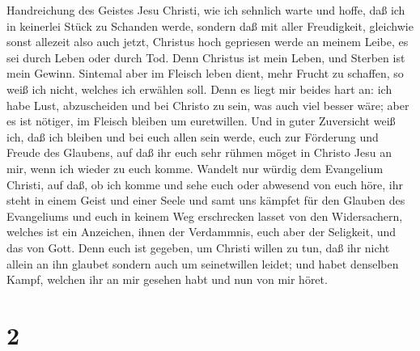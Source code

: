 Handreichung des Geistes Jesu Christi,  wie ich sehnlich
warte und hoffe, daß ich in keinerlei Stück zu Schanden werde, sondern
daß mit aller Freudigkeit, gleichwie sonst allezeit also auch jetzt,
Christus hoch gepriesen werde an meinem Leibe, es sei durch Leben oder
durch Tod.  Denn Christus ist mein Leben, und Sterben ist
mein Gewinn.  Sintemal aber im Fleisch leben dient, mehr
Frucht zu schaffen, so weiß ich nicht, welches ich erwählen soll.
 Denn es liegt mir beides hart an: ich habe Lust,
abzuscheiden und bei Christo zu sein, was auch viel besser wäre;
 aber es ist nötiger, im Fleisch bleiben um euretwillen.
 Und in guter Zuversicht weiß ich, daß ich bleiben und bei
euch allen sein werde, euch zur Förderung und Freude des Glaubens,
 auf daß ihr euch sehr rühmen möget in Christo Jesu an mir,
wenn ich wieder zu euch komme.  Wandelt nur würdig dem
Evangelium Christi, auf daß, ob ich komme und sehe euch oder abwesend
von euch höre, ihr steht in einem Geist und einer Seele und samt uns
kämpfet für den Glauben des Evangeliums  und euch in keinem
Weg erschrecken lasset von den Widersachern, welches ist ein Anzeichen,
ihnen der Verdammnis, euch aber der Seligkeit, und das von Gott.
 Denn euch ist gegeben, um Christi willen zu tun, daß ihr
nicht allein an ihn glaubet sondern auch um seinetwillen leidet;
 und habet denselben Kampf, welchen ihr an mir gesehen habt
und nun von mir höret.

\hypertarget{section-1}{%
\section{2}\label{section-1}}

